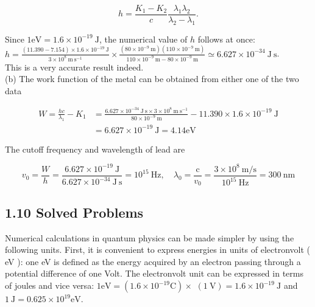 \documentclass[10pt]{article}
\begin{document}
\begin{equation*}
h=\frac{K_{1}-K_{2}}{c} \frac{\lambda_{1} \lambda_{2}}{\lambda_{2}-\lambda_{1}} . \tag{1.24}
\end{equation*}


Since $1 \mathrm{eV}=1.6 \times 10^{-19} \mathrm{~J}$, the numerical value of $h$ follows at once:\\
$h=\frac{(11.390-7.154) \times 1.6 \times 10^{-19} \mathrm{~J}}{3 \times 10^{8} \mathrm{~m} \mathrm{~s}^{-1}} \times \frac{\left(80 \times 10^{-9} \mathrm{~m}\right)\left(110 \times 10^{-9} \mathrm{~m}\right)}{110 \times 10^{-9} \mathrm{~m}-80 \times 10^{-9} \mathrm{~m}} \simeq 6.627 \times 10^{-34} \mathrm{~J} \mathrm{~s}$.\\
This is a very accurate result indeed.\\
(b) The work function of the metal can be obtained from either one of the two data


\begin{align*}
W=\frac{h c}{\lambda_{1}}-K_{1} & =\frac{6.627 \times 10^{-34} \mathrm{~J} \mathrm{~s} \times 3 \times 10^{8} \mathrm{~m} \mathrm{~s}^{-1}}{80 \times 10^{-9} \mathrm{~m}}-11.390 \times 1.6 \times 10^{-19} \mathrm{~J} \\
& =6.627 \times 10^{-19} \mathrm{~J}=4.14 \mathrm{eV} \tag{1.26}
\end{align*}


The cutoff frequency and wavelength of lead are


\begin{equation*}
v_{0}=\frac{W}{h}=\frac{6.627 \times 10^{-19} \mathrm{~J}}{6.627 \times 10^{-34} \mathrm{~J} \mathrm{~s}}=10^{15} \mathrm{~Hz}, \quad \lambda_{0}=\frac{\mathrm{c}}{v_{0}}=\frac{3 \times 10^{8} \mathrm{~m} / \mathrm{s}}{10^{15} \mathrm{~Hz}}=300 \mathrm{~nm} \tag{1.27}
\end{equation*}

\subsection*{1.10 Solved Problems}
Numerical calculations in quantum physics can be made simpler by using the following units. First, it is convenient to express energies in units of electronvolt ( eV ): one eV is defined as the energy acquired by an electron passing through a potential difference of one Volt. The electronvolt unit can be expressed in terms of joules and vice versa: $1 \mathrm{eV}=\left(1.6 \times 10^{-19} \mathrm{C}\right) \times$ $(1 \mathrm{~V})=1.6 \times 10^{-19} \mathrm{~J}$ and $1 \mathrm{~J}=0.625 \times 10^{19} \mathrm{eV}$.
\end{document}
